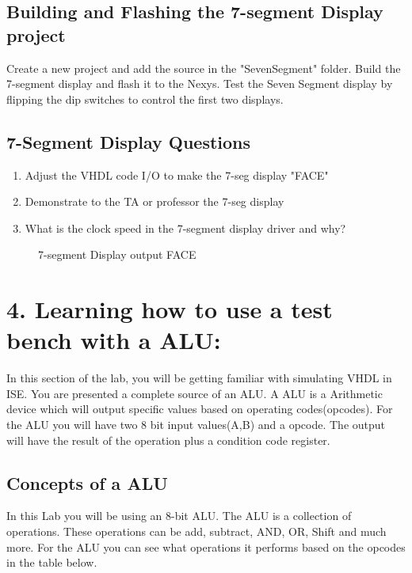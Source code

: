 \documentclass{article}
\begin{document}
\subsection{Building and Flashing the 7-segment Display project}
Create a new project and add the source in the "SevenSegment" folder. Build the 7-segment display and flash it to the Nexys. Test the Seven Segment display by flipping the dip switches to control the first two displays.

\subsection{7-Segment Display Questions}

\begin{enumerate}
  \item Adjust the VHDL code I/O to make the 7-seg display "FACE"
  \item Demonstrate to the TA or professor the 7-seg display
  \item What is the clock speed in the 7-segment display driver and why?
\end{enumerate}

\begin{figure}[!htb]
  \centering
  \caption{7-segment Display output FACE}
\end{figure}

\newpage

\section{4. Learning how to use a test bench with a ALU:}
In this section of the lab, you will be getting familiar with simulating VHDL in ISE. You are presented a complete source of an ALU. A ALU is a Arithmetic device which will output specific values based on operating codes(opcodes). For the ALU you will have two 8 bit input values(A,B) and a opcode. The output will have the result of the operation plus a condition code register.
\subsection{Concepts of a ALU}
In this Lab you will be using an 8-bit ALU. The ALU is a collection of operations. These operations can be add, subtract, AND, OR, Shift and much more. For the ALU you can see what operations it performs based on the opcodes in the table below.
\end{document}
